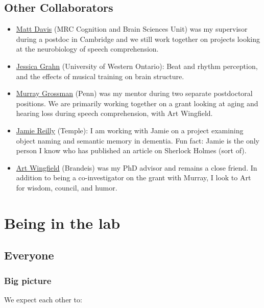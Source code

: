 \documentclass[letterpaper,12pt,oneside]{memoir}
\begin{document}
\section{Other Collaborators}
\begin{itemize}
\item{\href{http://www.mrc-cbu.cam.ac.uk/people/matt.davis/}{Matt Davis} (MRC Cognition and Brain Sciences Unit) was my supervisor during a postdoc in Cambridge and we still work together on projects looking at the neurobiology of speech comprehension.}
\item{\href{http://www.jessicagrahn.com}{Jessica Grahn} (University of Western Ontario): Beat and rhythm perception, and the effects of musical training on brain structure.}
\item{\href{http://ftd.med.upenn.edu/}{Murray Grossman} (Penn) was my mentor during two separate postdoctoral positions. We are primarily working together on a grant looking at aging and hearing loss during speech comprehension, with Art Wingfield.}
\item{\href{http://www.reilly-coglab.com}{Jamie Reilly} (Temple): I am working with Jamie on a project examining object naming and semantic memory in dementia. Fun fact: Jamie is the only person I know who has published an article on Sherlock Holmes (sort of).}
\item{\href{http://www.bio.brandeis.edu/faculty/wingfield.html}{Art Wingfield} (Brandeis) was my PhD advisor and remains a close friend. In addition to being a co-investigator on the grant with Murray, I look to Art for wisdom, council, and humor.}
\end{itemize}



\chapter{Being in the lab}




\section{Everyone}

\subsection{Big picture}

We expect each other to:
\end{document}
